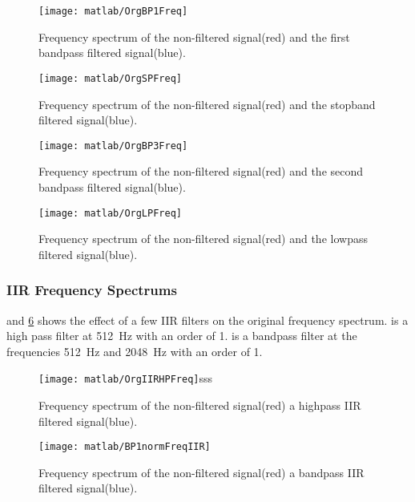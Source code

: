 \begin{figure}[!htb]
	\centering
	\texttt{[image: matlab/OrgBP1Freq]}
	\caption{Frequency spectrum of the non-filtered signal(red) and the first bandpass filtered signal(blue).}
	\label{fig:FIR_bandpass1}
\end{figure}

\begin{figure}[!htb]
	\centering
	\texttt{[image: matlab/OrgSPFreq]}
	\caption{Frequency spectrum of the non-filtered signal(red) and the stopband filtered signal(blue).}
	\label{fig:FIR_stopband}
\end{figure}

\begin{figure}[!htb]
	\centering
	\texttt{[image: matlab/OrgBP3Freq]}
	\caption{Frequency spectrum of the non-filtered signal(red) and the second bandpass filtered signal(blue).}
	\label{fig:FIR_bandpass2}
\end{figure}

\begin{figure}[!htb]
	\centering
	\texttt{[image: matlab/OrgLPFreq]}
	\caption{Frequency spectrum of the non-filtered signal(red) and the lowpass filtered signal(blue).}
	\label{fig:FIR_lowpass}
\end{figure}

\clearpage

\subsubsection{IIR Frequency Spectrums}
 and \cref{fig:IIR_BP1bandpass} shows the effect of a few IIR filters on the original frequency spectrum.  is a high pass filter at \SI{512}{\hertz} with an order of 1.  is a bandpass filter at the frequencies \SI{512}{\hertz} and \SI{2048}{\hertz} with an order of 1.

\begin{figure}[!htb]
	\centering
	\texttt{[image: matlab/OrgIIRHPFreq]}sss
	\caption{Frequency spectrum of the non-filtered signal(red) a highpass IIR filtered signal(blue).}
	\label{fig:IIR_BP1highpass}
\end{figure}

\begin{figure}[!htb]
	\centering
	\texttt{[image: matlab/BP1normFreqIIR]}
	\caption{Frequency spectrum of the non-filtered signal(red) a bandpass IIR filtered signal(blue).}
	\label{fig:IIR_BP1bandpass}
\end{figure}

